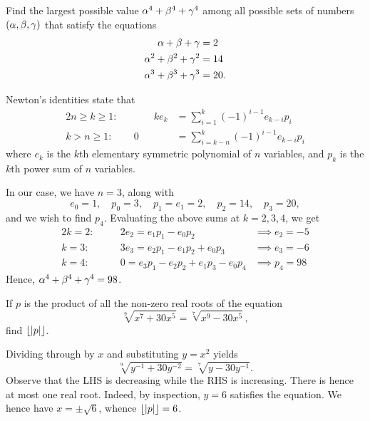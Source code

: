 \begin{question}[98]\label{A::2021-O-1-9}
    Find the largest possible value $\alpha^4 + \beta^4 + \gamma^4$ among all possible sets of numbers $(\alpha, \beta, \gamma)$ that satisfy the equations
    \[\begin{aligned}
        \alpha + \beta + \gamma &= 2\\
        \alpha^2 + \beta^2 + \gamma^2 &= 14\\
        \alpha^3 + \beta^3 + \gamma^3 &= 20.
    \end{aligned}\]
\end{question}
\begin{solution*}
    Newton's identities state that
    \begin{alignat*}{2}
        n \geq k \geq 1 :&& \qquad ke_k &= \sum_{i=1}^k (-1)^{i-1} e_{k-i} p_i\\
        k > n \geq 1 :&& 0 &= \sum_{i=k-n}^k (-1)^{i-1} e_{k-i} p_i
    \end{alignat*}
    where $e_k$ is the $k$th elementary symmetric polynomial of $n$ variables, and $p_k$ is the $k$th power sum of $n$ variables.
    
    In our case, we have $n=3$, along with \[e_0 = 1, \quad p_0 = 3, \quad p_1 = e_1 = 2, \quad p_2 = 14, \quad p_3 = 20,\] and we wish to find $p_4$. Evaluating the above sums at $k = 2, 3, 4$, we get
    \begin{alignat*}{2}
        k = 2 : && \quad2e_2 = e_1p_1 - e_0p_2 &\implies e_2 = -5\\
        k = 3 : && \quad 3e_3 = e_2p_1 - e_1p_2 + e_0p_3 &\implies e_3 = -6\\
        k = 4 : && \quad 0 = e_3p_1 - e_2p_2 + e_1p_3 - e_0p_4 &\implies p_4 = 98
    \end{alignat*}
    Hence, $\alpha^4 + \beta^4 + \gamma^4 = 98$.
\end{solution*}

\begin{question}[6]\label{A::2021-O-1-10}
    If $p$ is the product of all the non-zero real roots of the equation \[\sqrt[9]{x^7 + 30x^5} = \sqrt[7]{x^9 - 30x^5},\] find $\left\lfloor \left\lvert p \right\rvert \right\rfloor$.
\end{question}
\begin{solution*}
    Dividing through by $x$ and substituting $y = x^2$ yields \[\sqrt[9]{y^{-1} + 30y^{-2}} = \sqrt[7]{y - 30y^{-1}}.\] Observe that the LHS is decreasing while the RHS is increasing. There is hence at most one real root. Indeed, by inspection, $y = 6$ satisfies the equation. We hence have $x = \pm \sqrt 6$, whence $\left\lfloor \left\lvert p \right\rvert \right\rfloor = 6$.
\end{solution*}

